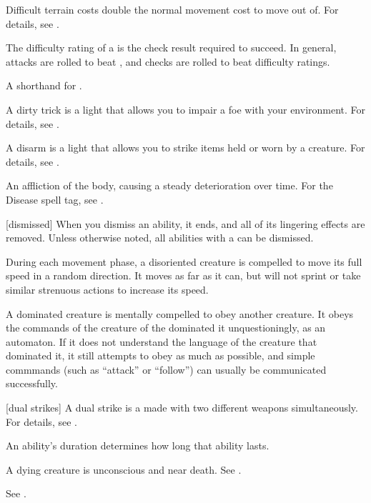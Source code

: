  Difficult terrain costs double the normal movement cost to move out of.
For details, see .

 The difficulty rating of a  is the check result required to succeed.
In general, attacks are rolled to beat , and checks are rolled to beat difficulty ratings.

 A shorthand for .

 A dirty trick is a light  that allows you to impair a foe with your environment.
For details, see .

 A disarm is a light  that allows you to strike items held or worn by a creature.
For details, see .

 An affliction of the body, causing a steady deterioration over time. For the Disease spell tag, see .

[dismissed] When you dismiss an ability, it ends, and all of its lingering effects are removed.
Unless otherwise noted, all abilities with a  can be dismissed.

 During each movement phase, a disoriented creature is compelled to move its full speed in a random direction.
It moves as far as it can, but will not sprint or take similar strenuous actions to increase its speed.

 A dominated creature is mentally compelled to obey another creature.
It obeys the commands of the creature of the dominated it unquestioningly, as an automaton.
If it does not understand the language of the creature that dominated it, it still attempts to obey as much as possible, and simple commmands (such as ``attack'' or ``follow'') can usually be communicated successfully.

[dual strikes] A dual strike is a  made with two different weapons simultaneously.
For details, see .

 An ability's duration determines how long that ability lasts.

 A dying creature is unconscious and near death. See .

 See .

